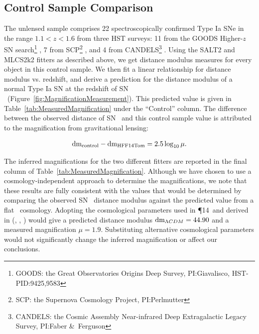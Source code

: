\subsection{Control Sample Comparison}
\label{sec:ControlSampleComparison}

The unlensed sample comprises 22 spectroscopically confirmed Type Ia
SNe in the range $1.1<z<1.6$ from three HST surveys: 11 from the GOODS Higher-$z$ SN search\footnote{GOODS: the Great Observatories Origins Deep Survey, PI:Giavalisco, HST-PID:9425,9583} \citep{Strolger:2004,Riess:2007}, 7 from SCP\footnote{SCP: the Supernova Cosmology Project, PI:Perlmutter} \citep{Suzuki:2012}, and 4 from CANDELS\footnote{CANDELS: the Cosmic Assembly Near-infrared Deep Extragalactic Legacy Survey, PI:Faber \&\ Ferguson} \citep{Rodney:2012,Rodney:2014}.  Using the SALT2 and MLCS2k2
fitters as described above, we get distance modulus measures for every
object in this control sample.  We then fit a linear relationship for
distance modulus vs. redshift, and derive a prediction for the
distance modulus of a normal Type Ia SN at the redshift of SN \tomas\
(Figure~\ref{fig:MagnificationMeasurement}).
This predicted value is given in
Table~\ref{tab:MeasuredMagnification} under the ``Control'' column.
The difference between the observed distance of SN \tomas\ and this
control sample value is attributed to the magnification from
gravitational lensing:

\begin{equation} \label{eqn:mu}
{\rm dm}_{\rm control} - {\rm dm}_{\rm HFF14Tom} = 2.5 \log_{10}\mu.
\end{equation}

\noindent The inferred magnifications for the two different fitters are
reported in the final column of Table~\ref{tab:MeasuredMagnification}.
Although we have chosen to use a cosmology-independent approach to
determine the magnifications, we note that these results are fully
consistent with the values that would be determined by comparing the
observed SN \tomas\ distance modulus against the predicted value from
a flat \LCDM\ cosmology. Adopting the cosmological parameters used
in \P14\ and derived in \citet{Sullivan:2011}
(, , ) would give a predicted distance modulus
${\rm dm}_{\Lambda CDM}=44.90$ and a measured magnification $\mu=1.9$.
Substituting alternative cosmological
parameters \citep[e.g.,][]{Betoule:2014,Planck:2015} would not
significantly change the inferred magnification or affect our
conclusions.

